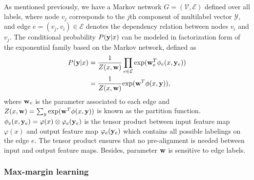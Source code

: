 \documentclass[english]{tktltiki}
\newcommand{\Ecal}{\mathcal{E}}
\newcommand{\Ycal}{\mathcal{Y}} %
\newcommand{\Vcal}{\mathcal{V}}
\newcommand{\yb}{{\bf y}}
\newcommand{\wb}{{\bf w}}
\begin{document}
As mentioned previously, we have a Markov network $G = (\Vcal,\Ecal)$ defined over all labels, where node $v_j$ corresponds to the $j$th component of multilabel vector $\Ycal$, and edge $e = (v_j,v_i) \in \Ecal$ denotes the dependency relation between nodes $v_i$ and $v_j$. The conditional probability $P(\yb|x)$ can be modeled in factorization form of the exponential family based on the Markov network, defined as
\begin{align*}
P(\yb|x) &= \frac{1}{Z(x,\wb)}\prod_{e \in \Ecal}{\text{exp}(\wb^T_e \phi_e(x,\yb_e))} \\
 &= \frac{1}{Z(x,\wb)} {\text{exp}(\wb^T \phi(x,\yb))},
\end{align*}
where $\wb_e$ is the parameter associated to each edge and $Z(x,\wb) = \sum_{y}{\text{exp}(\wb^T\phi(x,\yb))}$ is known as the partition function. $\phi_e(x,\yb_e) = \varphi(x) \otimes \varphi_e(\yb_e)$ is the tensor product between input feature map $\varphi(x)$ and output feature map $\varphi_e(\yb_e)$ which contains all possible labelings on the edge $e$. The tensor product ensures that no pre-alignment is needed between input and output feature maps. Besides, parameter $\wb$ is sensitive to edge labels.

\subsubsection{Max-margin learning}
\end{document}
